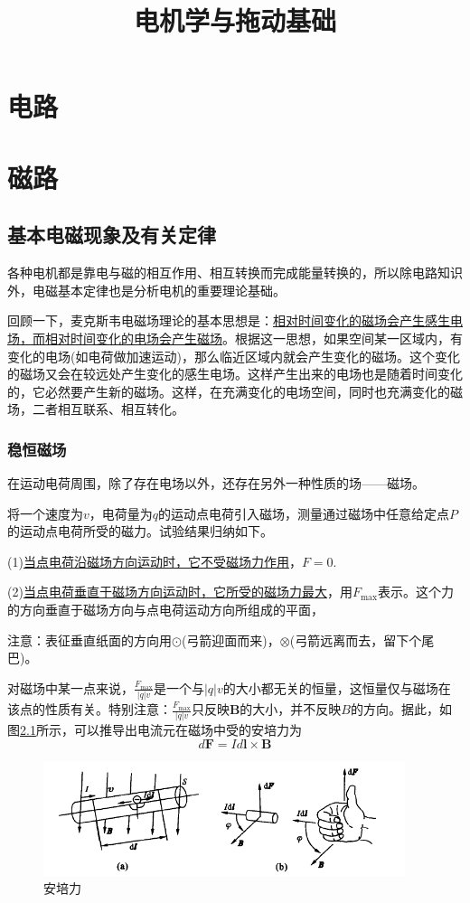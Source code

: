 \documentclass{book}
\begin{document}
\title{电机学与拖动基础}
\chapter{电路}


\chapter{磁路}
\section{基本电磁现象及有关定律}
各种电机都是靠电与磁的相互作用、相互转换而完成能量转换的，所以除电路知识外，电磁基本定律也是分析电机的重要理论基础。

回顾一下，麦克斯韦电磁场理论的基本思想是：\uline{相对时间变化的磁场会产生感生电场，而相对时间变化的电场会产生磁场}。根据这一思想，如果空间某一区域内，有变化的电场(如电荷做加速运动)，那么临近区域内就会产生变化的磁场。这个变化的磁场又会在较远处产生变化的感生电场。这样产生出来的电场也是随着时间变化的，它必然要产生新的磁场。这样，在充满变化的电场空间，同时也充满变化的磁场，二者相互联系、相互转化。

\subsection{稳恒磁场}
在运动电荷周围，除了存在电场以外，还存在另外一种性质的场——磁场。

将一个速度为$v$，电荷量为$q$的运动点电荷引入磁场，测量通过磁场中任意给定点$P$的运动点电荷所受的磁力。试验结果归纳如下。
\par (1)\uline{当点电荷沿磁场方向运动时，它不受磁场力作用}，$F=0$.

\par (2)\uline{当点电荷垂直于磁场方向运动时，它所受的磁场力最大}，用$F_{\max}$表示。这个力的方向垂直于磁场方向与点电荷运动方向所组成的平面，

注意：表征垂直纸面的方向用$\odot$(弓箭迎面而来)，$\otimes$(弓箭远离而去，留下个尾巴)。

对磁场中某一点来说，$\frac{F_{\max}}{\left|q\right|v}$是一个与$\left|q\right|v$的大小都无关的恒量，这恒量仅与磁场在该点的性质有关。特别注意：$\frac{F_{\max}}{\left|q\right|v}$只反映$\bm{B}$的大小，并不反映$B$的方向。据此，如图\ref{fig:ap force}所示，可以推导出电流元在磁场中受的安培力为
\[d\bm{F}=Id\bm{l}\times \bm{B}\]
\begin{figure}[H]
	\centering
	\includegraphics[width=25pc]{apeiforce}
	\caption{安培力}
	\label{fig:ap force}
\end{figure}
\end{document}
